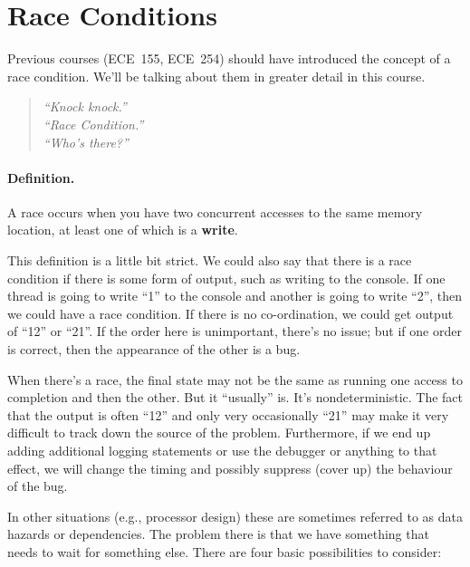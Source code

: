 





\section*{Race Conditions}
Previous courses (ECE~155, ECE~254) should have introduced the concept of a race condition. We'll be talking about them in greater detail in this course.

\begin{quote}
\textit{
	``Knock knock.''\\
	``Race Condition.''\\
	``Who's there?''
	}
\end{quote}

\paragraph{Definition.} A race occurs when you have two concurrent accesses to the
same memory location, at least one of which is a {\bf write}.

This definition is a little bit strict. We could also say that there is a race condition if there is some form of output, such as writing to the console. If one thread is going to write ``1'' to the console and another is going to write ``2'', then we could have a race condition. If there is no co-ordination, we could get output of ``12'' or ``21''. If the order here is unimportant, there's no issue; but if one order is correct, then the appearance of the other is a bug.

When there's a race, the final state may not be the same as running
one access to completion and then the other. But it ``usually'' is. It's nondeterministic. The fact that the output is often ``12'' and only very occasionally ``21'' may make it very difficult to track down the source of the problem. Furthermore, if we end up adding additional logging statements or use the debugger or anything to that effect, we will change the timing and possibly suppress (cover up) the behaviour of the bug.

In other situations (e.g., processor design) these are sometimes referred to as data hazards or dependencies. The problem there is that we have something that needs to wait for something else. There are four basic possibilities to consider:

